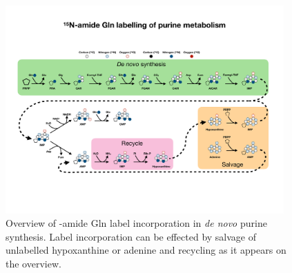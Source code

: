 \begin{figure}
    \centering
    \includegraphics[width=0.95\textwidth]{figures/chap2/purine_tracing_overvew.pdf}
    \caption[Purine metabolism \hNi-amide Gln tracing overview]{
    Overview of \hNi-amide Gln label incorporation in \textit{de novo} purine synthesis.
    Label incorporation can be effected by salvage of unlabelled hypoxanthine or adenine and recycling as it appears on the overview.
    }
    \label{fig:ch2:pur_tr_ov}
\end{figure}





